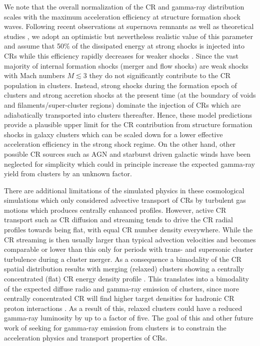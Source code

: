 \documentclass[12pt,manuscript]{aastex}
\begin{document}
We note that the overall normalization of the CR and gamma-ray distribution
scales with the maximum acceleration efficiency at structure formation shock
waves. Following recent observations at supernova remnants
\cite{article:Helder_etal:2009} as well as theoretical studies
\cite{article:KandJones:2005}, we adopt an optimistic but nevertheless realistic
value of this parameter and assume that 50\% of the dissipated energy at strong
shocks is injected into CRs while this efficiency rapidly decreases for weaker
shocks \cite{article:EnsslinPfrommerSpringelJubelgas:2007}. Since the vast majority of internal formation
shocks (merger and flow shocks) are weak shocks with Mach numbers $M\lesssim3$
\citep[e.g.,][]{article:Ryu_etal:2003, article:PfrommerSpringelEnsslinJubelgas} they do not
significantly contribute to the CR population in clusters. Instead, strong
shocks during the formation epoch of clusters and strong accretion shocks at the
present time (at the boundary of voids and filaments/super-cluster regions)
dominate the injection of CRs which are adiabatically transported into clusters
thereafter. Hence, these model predictions provide a plausible upper limit for
the CR contribution from structure formation shocks in galaxy clusters which can
be scaled down for a lower effective acceleration efficiency in the strong shock
regime.  On the other hand, other possible CR sources such as AGN and starburst
driven galactic winds have been neglected for simplicity which could in
principle increase the expected gamma-ray yield from clusters by an unknown
factor.

There are additional limitations of the simulated physics in these cosmological
simulations which only considered advective transport of CRs by turbulent gas
motions which produces centrally enhanced profiles.  However, active CR
transport such as CR diffusion and streaming tends to drive the CR radial
profiles towards being flat, with equal CR number density everywhere. While the
CR streaming is then usually larger than typical advection velocities and
becomes comparable or lower than this only for periods with trans- and
supersonic cluster turbulence during a cluster merger. As a consequence a
bimodality of the CR spatial distribution results with merging (relaxed)
clusters showing a centrally concentrated (flat) CR energy density profile
\cite{article:EnsslinPfrommerMiniatiSubramanian:2011}.  This translates into a bimodality of the expected
diffuse radio and gamma-ray emission of clusters, since more centrally
concentrated CR will find higher target densities for hadronic CR proton
interactions \cite{article:EnsslinPfrommerMiniatiSubramanian:2011}. As a result of this, relaxed clusters
could have a reduced gamma-ray luminosity by up to a factor of five. The goal of
this and other future work of seeking for gamma-ray emission from clusters is to
constrain the acceleration physics and transport properties of CRs.
\end{document}
